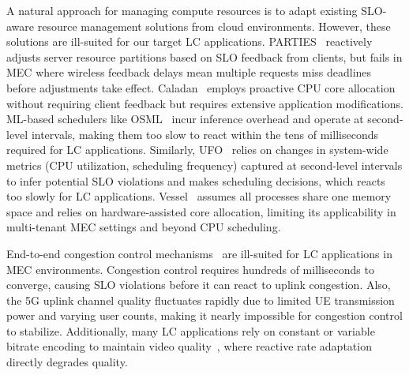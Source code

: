 A natural approach for managing compute resources is to adapt existing SLO-aware resource management solutions from cloud environments.
However, these solutions are ill-suited for our target LC applications.
PARTIES~\cite{parties:asplos19} reactively adjusts server resource partitions based on SLO feedback from clients, but fails in MEC where wireless feedback delays mean multiple requests miss deadlines before adjustments take effect.
Caladan~\cite{caladan:osdi20} employs proactive CPU core allocation without requiring client feedback but requires extensive application modifications.
ML-based schedulers like OSML~\cite{liu2023intelligent} incur inference overhead and operate at second-level intervals, making them too slow to react within the tens of milliseconds required for LC applications.
Similarly, UFO~\cite{peng2024ufo} relies on changes in system-wide metrics (\eg CPU utilization, scheduling frequency) captured at second-level intervals to infer potential SLO violations and makes scheduling decisions, which reacts too slowly for LC applications. 
Vessel~\cite{lin2024fast} assumes all processes share one memory space and relies on hardware-assisted core allocation, limiting its applicability in multi-tenant MEC settings and beyond CPU scheduling.

End-to-end congestion control mechanisms~\cite{carlucci2017congestion,zhu2020network,johansson2017self} are ill-suited for LC applications in MEC environments.
Congestion control requires hundreds of milliseconds to converge, causing SLO violations before it can react to uplink congestion.
Also, the 5G uplink channel quality fluctuates rapidly due to limited UE transmission power and varying user counts, making it nearly impossible for congestion control to stabilize.
Additionally, many LC applications rely on constant or variable bitrate encoding to maintain video quality~\cite{Fortinet2020_IPSurveillanceCameraBandwidth,Sony_BRCX400_Specs}, where reactive rate adaptation directly degrades quality.

